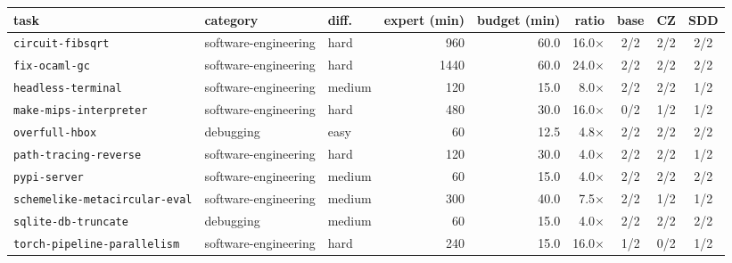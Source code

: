 
\begin{tabular}{@{}lllrrrccc@{}}
\toprule
task & category & diff. & expert (min) & budget (min) & ratio & base & CZ & SDD \\
\midrule
\texttt{\footnotesize circuit-fibsqrt} & software-engineering & hard & 960 & 60.0 & 16.0$\times$ & 2/2 & 2/2 & 2/2 \\
\texttt{\footnotesize fix-ocaml-gc} & software-engineering & hard & 1440 & 60.0 & 24.0$\times$ & 2/2 & 2/2 & 2/2 \\
\texttt{\footnotesize headless-terminal} & software-engineering & medium & 120 & 15.0 & 8.0$\times$ & 2/2 & 2/2 & 1/2 \\
\texttt{\footnotesize make-mips-interpreter} & software-engineering & hard & 480 & 30.0 & 16.0$\times$ & 0/2 & 1/2 & 1/2 \\
\texttt{\footnotesize overfull-hbox} & debugging & easy & 60 & 12.5 & 4.8$\times$ & 2/2 & 2/2 & 2/2 \\
\texttt{\footnotesize path-tracing-reverse} & software-engineering & hard & 120 & 30.0 & 4.0$\times$ & 2/2 & 2/2 & 1/2 \\
\texttt{\footnotesize pypi-server} & software-engineering & medium & 60 & 15.0 & 4.0$\times$ & 2/2 & 2/2 & 2/2 \\
\texttt{\footnotesize schemelike-metacircular-eval} & software-engineering & medium & 300 & 40.0 & 7.5$\times$ & 2/2 & 1/2 & 1/2 \\
\texttt{\footnotesize sqlite-db-truncate} & debugging & medium & 60 & 15.0 & 4.0$\times$ & 2/2 & 2/2 & 2/2 \\
\texttt{\footnotesize torch-pipeline-parallelism} & software-engineering & hard & 240 & 15.0 & 16.0$\times$ & 1/2 & 0/2 & 1/2 \\
\bottomrule
\end{tabular}

